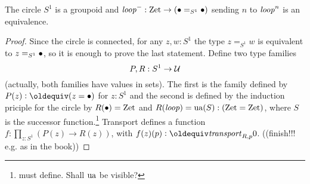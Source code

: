 \begin{lemma}\label{lem:S1groupoid}
  The circle $S^1$ is a groupoid and $\mathit{loop}^-:\mathrm{Zet}\to(\bullet=_{S^1}\bullet)$ sending $n$ to $\mathit{loop}^n$ is an equivalence.
\end{lemma}
\begin{proof}
  Since the circle is connected, for any $z,w:S^1$ the type $z=_{S^1}w$ is equivalent to $z=_{S^1}\bullet$, so it is enough to prove the last statement.  Define two type families 
$$P,R:S^1\to\mathcal{U}$$ (actually, both families have values in sets).  The first is the family defined by $P(z)\defequi(z=\base)$ for $z:S^1$ and the second is defined by the induction priciple for the circle by  %
$R(\bullet)=\mathrm{Zet}$ and $R(\mathit{loop})=\mathrm{ua}(S):(\mathrm{Zet}=\mathrm{Zet})$, where $S$ is the successor function.\footnote{must define.  Shall $\mathrm{ua}$ be visible?}%
Transport defines a function $f:\prod_{z:S^1}(P(z)\to R(z))$, with $f(z)(p)\defequi\trp_{R,p}0$.
((finish!!! e.g. as in the book))
\end{proof}

